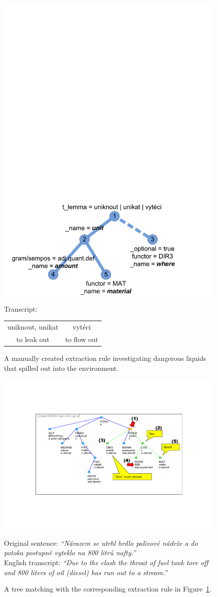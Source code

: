 \begin{figure}
	\centering
		\includegraphics[width=0.5\hsize]{eenv_extract_patern}
\\Transcript:\\
\begin{tabular}{|c|c|}
\hline
uniknout, unikat & vytéci\\
to leak out & to flow out\\
\hline
\end{tabular}		
	\caption{A manually created extraction rule investigating dangerous liquids that spilled out into the environment.}
	\label{fig:manual_eenv_extract_patern}
\end{figure}


\begin{figure}
	\centering
		\includegraphics[angle=-90, width=0.6\hsize]{eenv_matching_tree}
		
Original sentence: 
\emph{``Nárazem se utrhl hrdlo palivové nádrže a do potoka postupně vyteklo na 800 litrů nafty.''}\\
English transcript: 
\emph{``Due to the clash the throat of fuel tank tore off and 800 liters of oil (diesel) has run out to a stream.''}
	\caption{A tree matching with the corresponding extraction rule in Figure~\ref{fig:manual_eenv_extract_patern}.}
	\label{fig:manual_eenv_matching_tree}
\end{figure}


